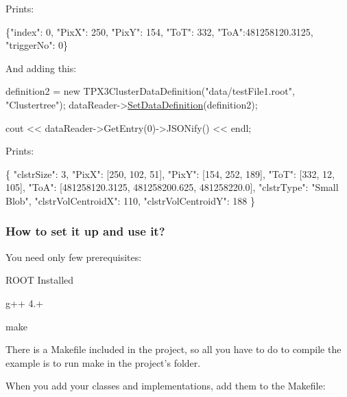 Prints\+:


\begin{DoxyCode}
\{\textcolor{stringliteral}{"index"}: 0, \textcolor{stringliteral}{"PixX"}: 250, \textcolor{stringliteral}{"PixY"}: 154, \textcolor{stringliteral}{"ToT"}: 332, \textcolor{stringliteral}{"ToA"}:481258120.3125, \textcolor{stringliteral}{"triggerNo"}: 0\}
\end{DoxyCode}


And adding this\+:


\begin{DoxyCode}
definition2 = \textcolor{keyword}{new} TPX3ClusterDataDefinition(\textcolor{stringliteral}{"data/testFile1.root"}, \textcolor{stringliteral}{"Clustertree"});
dataReader->\hyperlink{classRootDataReader_ad670745df69f90ea6578d7c29cab716f}{SetDataDefinition}(definition2);

cout << dataReader->GetEntry(0)->JSONify() << endl;
\end{DoxyCode}


Prints\+:


\begin{DoxyCode}
\{
    \textcolor{stringliteral}{"clstrSize"}: 3, 
    \textcolor{stringliteral}{"PixX"}: [250, 102, 51], 
    \textcolor{stringliteral}{"PixY"}: [154, 252, 189], 
    \textcolor{stringliteral}{"ToT"}: [332, 12, 105], 
    \textcolor{stringliteral}{"ToA"}: [481258120.3125, 481258200.625, 481258220.0], 
    \textcolor{stringliteral}{"clstrType"}: \textcolor{stringliteral}{"Small Blob"}, 
    \textcolor{stringliteral}{"clstrVolCentroidX"}: 110, 
    \textcolor{stringliteral}{"clstrVolCentroidY"}: 188
\}
\end{DoxyCode}


\subsubsection*{How to set it up and use it?}

You need only few prerequisites\+:


\begin{DoxyItemize}
\item R\+O\+O\+T Installed
\item g++ 4.+
\item make
\end{DoxyItemize}

There is a Makefile included in the project, so all you have to do to compile the example is to run {\ttfamily make} in the project's folder.

When you add your classes and implementations, add them to the Makefile\+:


